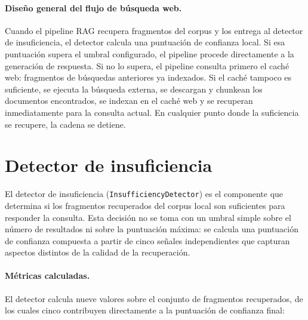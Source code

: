 \documentclass[11pt]{article}
\begin{document}
\paragraph{Diseño general del flujo de búsqueda web.}
Cuando el pipeline RAG recupera fragmentos del corpus y los entrega al detector de
insuficiencia, el detector calcula una puntuación de confianza local. Si esa puntuación supera
el umbral configurado, el pipeline procede directamente a la generación de respuesta. Si no lo
supera, el pipeline consulta primero el caché web: fragmentos de búsquedas anteriores ya
indexados. Si el caché tampoco es suficiente, se ejecuta la búsqueda externa, se descargan y
chunkean los documentos encontrados, se indexan en el caché web y se recuperan inmediatamente
para la consulta actual. En cualquier punto donde la suficiencia se recupere, la cadena se
detiene.

\section{Detector de insuficiencia}

El detector de insuficiencia (\texttt{InsufficiencyDetector}) es el componente que determina
si los fragmentos recuperados del corpus local son suficientes para responder la consulta. Esta
decisión no se toma con un umbral simple sobre el número de resultados ni sobre la puntuación
máxima: se calcula una puntuación de confianza compuesta a partir de cinco señales
independientes que capturan aspectos distintos de la calidad de la recuperación.

\paragraph{Métricas calculadas.}
El detector calcula nueve valores sobre el conjunto de fragmentos recuperados, de los cuales
cinco contribuyen directamente a la puntuación de confianza final:
\end{document}
